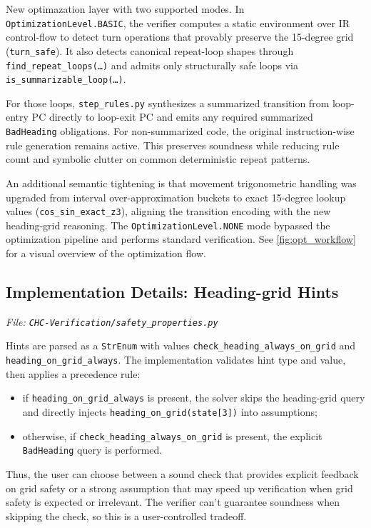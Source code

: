 New optimazation layer with two supported modes. In
\texttt{OptimizationLevel.BASIC}, the verifier computes a static environment over
IR control-flow to detect turn operations that provably preserve the 15-degree
grid (\texttt{turn\_safe}). It also detects canonical repeat-loop shapes through
\texttt{find\_repeat\_loops(\ldots)} and admits only structurally safe loops via
\texttt{is\_summarizable\_loop(\ldots)}.

For those loops, \texttt{step\_rules.py} synthesizes a summarized transition from
loop-entry PC directly to loop-exit PC and emits any required summarized
\texttt{BadHeading} obligations. For non-summarized code, the original
instruction-wise rule generation remains active. This preserves soundness while
reducing rule count and symbolic clutter on common deterministic repeat patterns.

An additional semantic tightening is that movement trigonometric handling was upgraded
from interval over-approximation buckets to exact 15-degree lookup values
(\texttt{cos\_sin\_exact\_z3}), aligning the transition encoding with the new
heading-grid reasoning.
The \texttt{OptimizationLevel.NONE} mode bypassed the optimization pipeline and performs standard verification.
See \autoref{fig:opt_workflow} for a visual overview of the optimization flow.


\subsection*{Implementation Details: Heading-grid Hints}\label{subsec:heading_grid_hints}
\noindent\textit{\small File: \texttt{CHC-Verification/safety\_properties.py}}

Hints are parsed as a \texttt{StrEnum} with values
\texttt{check\_heading\_always\_on\_grid} and
\texttt{heading\_on\_grid\_always}. The implementation validates hint type and
value, then applies a precedence rule:

\begin{itemize}[leftmargin=1.5em]
	\item if \texttt{heading\_on\_grid\_always} is present, the solver skips the
	heading-grid query and directly injects \texttt{heading\_on\_grid(state[3])}
	into assumptions;
	\item otherwise, if \texttt{check\_heading\_always\_on\_grid} is present,
	the explicit \texttt{BadHeading} query is performed.
\end{itemize}

Thus, the user can choose between a sound check that provides explicit feedback on grid safety or a strong assumption that may speed up verification when grid safety is expected or irrelevant. The verifier can't guarantee soundness when skipping the check, so this is a user-controlled tradeoff.

